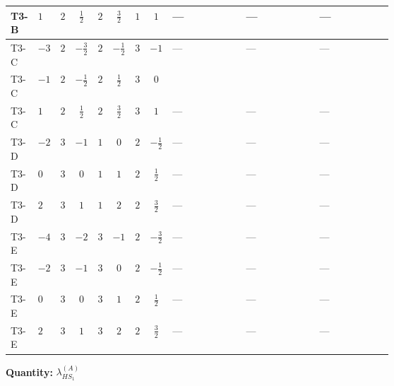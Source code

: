 \documentclass[8pt]{article}
\begin{document}
\begin{landscape}
\begin{longtable}{@{}llcccccc >{\raggedright\arraybackslash}p{0.21\linewidth} >{\raggedright\arraybackslash}p{0.21\linewidth} >{\raggedright\arraybackslash}p{0.21\linewidth}@{}}
\midrule
T3-B & $1$ & $2$ & $\frac{1}{2}$ & $2$ & $\frac{3}{2}$ & $1$ & $1$ & --- & --- & --- \\
\midrule
T3-C & $-3$ & $2$ & $-\frac{3}{2}$ & $2$ & $-\frac{1}{2}$ & $3$ & $-1$ & --- & --- & --- \\
\midrule
T3-C & $-1$ & $2$ & $-\frac{1}{2}$ & $2$ & $\frac{1}{2}$ & $3$ & $0$ & \scriptsize\adjustbox{max width=\linewidth}{$\begin{gathered} -64 {\lambda_{7}} \left({\lambda_{7}}\right)^{*}\end{gathered}$} & \scriptsize\adjustbox{max width=\linewidth}{$\begin{gathered} +4 {\lambda_{11}} \left({\lambda_{H H^\dagger S_1^\dagger S_2^\dagger}^{\rm Cross}}\right)^{*}\end{gathered}$} & \scriptsize\adjustbox{max width=\linewidth}{$\begin{gathered} +4 {\lambda_{H H^\dagger S_1^\dagger S_2^\dagger}^{\rm Cross}} (2 \left({\lambda_{H H^\dagger S_1^\dagger S_2^\dagger}^{\rm Cross}}\right)^{*}+\left({\lambda_{11}}\right)^{*})\end{gathered}$} \\
\midrule
T3-C & $1$ & $2$ & $\frac{1}{2}$ & $2$ & $\frac{3}{2}$ & $3$ & $1$ & --- & --- & --- \\
\midrule
T3-D & $-2$ & $3$ & $-1$ & $1$ & $0$ & $2$ & $-\frac{1}{2}$ & --- & --- & --- \\
\midrule
T3-D & $0$ & $3$ & $0$ & $1$ & $1$ & $2$ & $\frac{1}{2}$ & --- & --- & --- \\
\midrule
T3-D & $2$ & $3$ & $1$ & $1$ & $2$ & $2$ & $\frac{3}{2}$ & --- & --- & --- \\
\midrule
T3-E & $-4$ & $3$ & $-2$ & $3$ & $-1$ & $2$ & $-\frac{3}{2}$ & --- & --- & --- \\
\midrule
T3-E & $-2$ & $3$ & $-1$ & $3$ & $0$ & $2$ & $-\frac{1}{2}$ & --- & --- & --- \\
\midrule
T3-E & $0$ & $3$ & $0$ & $3$ & $1$ & $2$ & $\frac{1}{2}$ & --- & --- & --- \\
\midrule
T3-E & $2$ & $3$ & $1$ & $3$ & $2$ & $2$ & $\frac{3}{2}$ & --- & --- & --- \\
\midrule
\bottomrule
\end{longtable}
\clearpage
\noindent\textbf{Quantity: }$\lambda_{HS_1}^{(A)}$\par\smallskip

\end{landscape}
\end{document}
